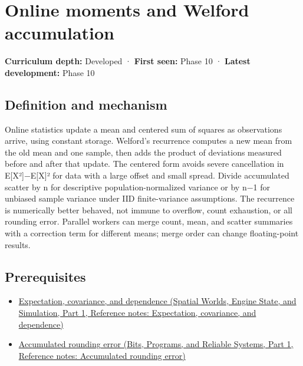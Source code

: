 \hypertarget{appendix-33237f0f618b}{}\label{referencestart:appendix-33237f0f618b}
\section{Online moments and Welford accumulation}\label{appendix-33237f0f618b-online-moments-and-welford-accumulation}

\hypertarget{appendix-33237f0f618b-online-moments-and-welford-accumulation}{}

\textbf{Curriculum depth:} Developed · \textbf{First seen:} Phase 10 · \textbf{Latest development:} Phase 10

\begin{allmightroledefinition}

\subsection{Definition and mechanism}\label{appendix-33237f0f618b-definition-and-mechanism}

\hypertarget{appendix-33237f0f618b-definition-and-mechanism}{}

Online statistics update a mean and centered sum of squares as observations arrive, using constant storage. Welford's recurrence computes a new mean from the old mean and one sample, then adds the product of deviations measured before and after that update. The centered form avoids severe cancellation in E{[}X²{]}−E{[}X{]}² for data with a large offset and small spread. Divide accumulated scatter by n for descriptive population-normalized variance or by n−1 for unbiased sample variance under IID finite-variance assumptions. The recurrence is numerically better behaved, not immune to overflow, count exhaustion, or all rounding error. Parallel workers can merge count, mean, and scatter summaries with a correction term for different means; merge order can change floating-point results.

\end{allmightroledefinition}

\subsection{Prerequisites}\label{appendix-33237f0f618b-prerequisites}

\hypertarget{appendix-33237f0f618b-prerequisites}{}

\begin{itemize}
\tightlist
\item
  \href{../05-Spatial-Worlds-Engine-State-and-Simulation-P01/main.pdf\#appendix-54c383df9992}{Expectation, covariance, and dependence (Spatial Worlds, Engine State, and Simulation, Part 1, Reference notes: Expectation, covariance, and dependence)}
\item
  \href{../01-Bits-Programs-and-Reliable-Systems-P01/main.pdf\#appendix-f82e270791c8}{Accumulated rounding error (Bits, Programs, and Reliable Systems, Part 1, Reference notes: Accumulated rounding error)}
\end{itemize}

